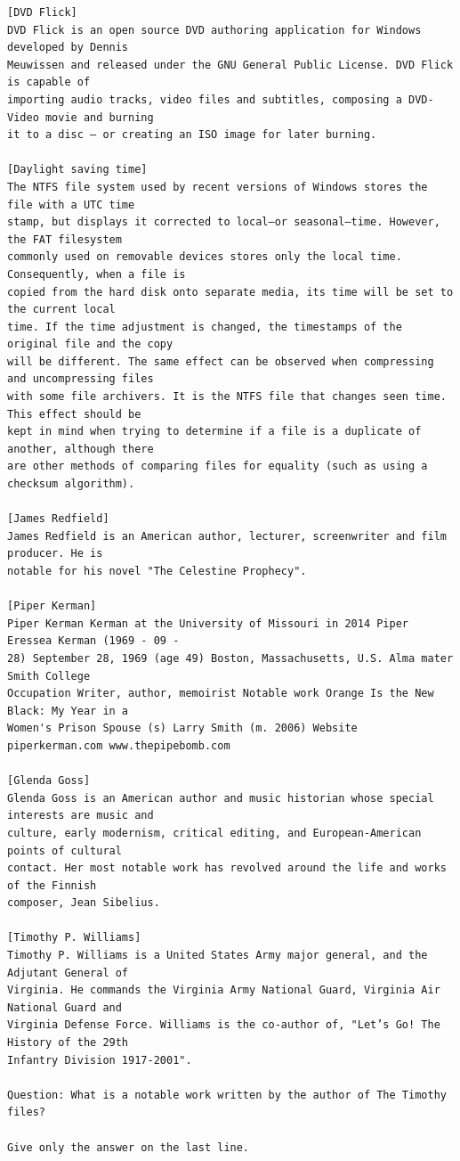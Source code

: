 \documentclass[10pt]{article}
\begin{document}
\begin{verbatim}
[DVD Flick]
DVD Flick is an open source DVD authoring application for Windows developed by Dennis
Meuwissen and released under the GNU General Public License. DVD Flick is capable of
importing audio tracks, video files and subtitles, composing a DVD-Video movie and burning
it to a disc – or creating an ISO image for later burning.

[Daylight saving time]
The NTFS file system used by recent versions of Windows stores the file with a UTC time
stamp, but displays it corrected to local—or seasonal—time. However, the FAT filesystem
commonly used on removable devices stores only the local time. Consequently, when a file is
copied from the hard disk onto separate media, its time will be set to the current local
time. If the time adjustment is changed, the timestamps of the original file and the copy
will be different. The same effect can be observed when compressing and uncompressing files
with some file archivers. It is the NTFS file that changes seen time. This effect should be
kept in mind when trying to determine if a file is a duplicate of another, although there
are other methods of comparing files for equality (such as using a checksum algorithm).

[James Redfield]
James Redfield is an American author, lecturer, screenwriter and film producer. He is
notable for his novel "The Celestine Prophecy".

[Piper Kerman]
Piper Kerman Kerman at the University of Missouri in 2014 Piper Eressea Kerman (1969 - 09 -
28) September 28, 1969 (age 49) Boston, Massachusetts, U.S. Alma mater Smith College
Occupation Writer, author, memoirist Notable work Orange Is the New Black: My Year in a
Women's Prison Spouse (s) Larry Smith (m. 2006) Website piperkerman.com www.thepipebomb.com

[Glenda Goss]
Glenda Goss is an American author and music historian whose special interests are music and
culture, early modernism, critical editing, and European-American points of cultural
contact. Her most notable work has revolved around the life and works of the Finnish
composer, Jean Sibelius.

[Timothy P. Williams]
Timothy P. Williams is a United States Army major general, and the Adjutant General of
Virginia. He commands the Virginia Army National Guard, Virginia Air National Guard and
Virginia Defense Force. Williams is the co-author of, "Let’s Go! The History of the 29th
Infantry Division 1917-2001".

Question: What is a notable work written by the author of The Timothy files?

Give only the answer on the last line.
\end{verbatim}
\end{document}
